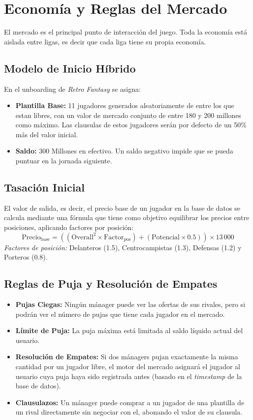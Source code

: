 \section{Economía y Reglas del Mercado}
El mercado es el principal punto de interacción del juego. Toda la economía está aislada entre ligas, es decir que cada liga tiene su propia economía.

\subsection{Modelo de Inicio Híbrido}
En el unboarding de \textit{Retro Fantasy} se asigna:
\begin{itemize}
    \item \textbf{Plantilla Base:} 11 jugadores generados aleatoriamente de entre los que estan libres, con un valor de mercado conjunto de entre 180 y 200 millones como máximo. Las clausulas de estos jugadores serán por defecto de un 50\% más del valor inicial.
    \item \textbf{Saldo:} 300 Millones en efectivo. Un saldo negativo impide que se pueda puntuar en la jornada siguiente.
\end{itemize}

\subsection{Tasación Inicial}
El valor de salida, es decir, el precio base de un jugador en la base de datos se calcula mediante una fórmula que tiene como objetivo equilibrar los precios entre posiciones, aplicando factores por posición:
\[ \text{Precio}_{\text{base}} = \left( (\text{Overall}^2 \times \text{Factor}_{\text{pos}}) + (\text{Potencial} \times 0.5) \right) \times 13\,000 \]
\textit{Factores de posición:} Delanteros (1.5), Centrocampistas (1.3), Defensas (1.2) y Porteros (0.8).

\subsection{Reglas de Puja y Resolución de Empates}
\begin{itemize}
    \item \textbf{Pujas Ciegas:} Ningún mánager puede ver las ofertas de sus rivales, pero si podrán ver el número de pujas que tiene cada jugador en el mercado.
    \item \textbf{Límite de Puja:} La puja máxima está limitada al saldo líquido actual del usuario.
    \item \textbf{Resolución de Empates:} Si dos mánagers pujan exactamente la misma cantidad por un jugador libre, el motor del mercado asignará el jugador al usuario cuya puja haya sido registrada antes (basado en el \textit{timestamp} de la base de datos).
    \item \textbf{Clausulazos:} Un mánager puede comprar a un jugador de una plantilla de un rival directamente sin negociar con el, abonando el valor de su clausula.
\end{itemize}


